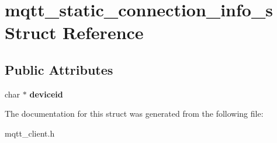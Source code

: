 \hypertarget{structmqtt__static__connection__info__s}{}\section{mqtt\+\_\+static\+\_\+connection\+\_\+info\+\_\+s Struct Reference}
\label{structmqtt__static__connection__info__s}
\subsection*{Public Attributes}
\begin{DoxyCompactItemize}
\item 
\mbox{\label{structmqtt__static__connection__info__s_a9efd26c2d7440158b8cf4dda302a4363}} 
char $\ast$ {\bfseries deviceid}
\end{DoxyCompactItemize}


The documentation for this struct was generated from the following file\+:\begin{DoxyCompactItemize}
\item 
mqtt\+\_\+client.\+h\end{DoxyCompactItemize}
